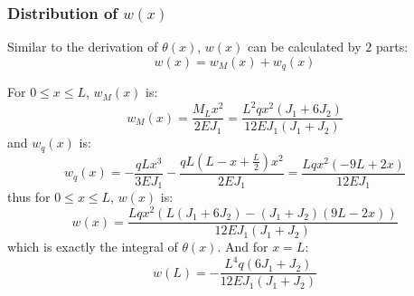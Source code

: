 \subsubsection{Distribution of $w(x)$}

Similar to the derivation of $\theta(x)$,
$w(x)$ can be calculated by $2$ parts:
\begin{equation}
    w(x) = w_M(x) + w_q(x)
\end{equation}

For $0 \leq x \leq L$, $w_M(x)$ is:
\begin{equation}
    w_M(x) =
    \frac{M_L x^2}{2EJ_1}=
    \frac{L^{2} q x^{2} \left(J_{1} + 6 J_{2}\right)}{12 E J_{1} \left(J_{1} + J_{2}\right)}
\end{equation}
and $w_q(x)$ is:
\begin{equation}
    w_q(x) =
    -\frac{qL x^3}{3EJ_1}-
    \frac{qL\left(L-x+\frac{L}{2}\right)x^2}{2EJ_1}=
    \frac{L q x^{2} \left(- 9 L + 2 x\right)}{12 E J_{1}}
\end{equation}
thus for $0 \leq x \leq L$, $w(x)$ is:
\begin{equation}
    w(x) = 
    \frac{L q x^{2} \left(L \left(J_{1} + 6 J_{2}\right) - \left(J_{1} + J_{2}\right) \left(9 L - 2 x\right)\right)}{12 E J_{1} \left(J_{1} + J_{2}\right)}
\end{equation}
which is exactly the integral of $\theta(x)$.
And for $x=L$:
\begin{equation}
    w(L) = - \frac{L^{4} q \left(6 J_{1} + J_{2}\right)}{12 E J_{1} \left(J_{1} + J_{2}\right)}
\end{equation}

